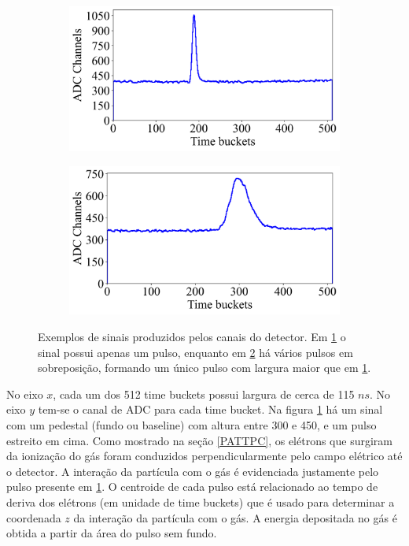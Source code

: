 \documentclass[a4paper,12pt,oneside]{book}
\begin{document}
\begin{figure}[H]
\centering
    \begin{subfigure}[b]{0.48\textwidth}
        \centering
        \includegraphics[scale=0.395]{figs/ex_sinal_1.png}
        \caption{}
        \label{subfig:exemplos_sinais_1}
    \end{subfigure}%
    \hfill
    \begin{subfigure}[b]{0.48\textwidth}
        \centering
        \includegraphics[scale=0.395]{figs/ex_sinal_2.png}
        \caption{}
        \label{subfig:exemplos_sinais_2}
    \end{subfigure}
\caption{Exemplos de sinais produzidos pelos canais do detector. Em \ref{subfig:exemplos_sinais_1} o sinal possui apenas um pulso, enquanto em \ref{subfig:exemplos_sinais_2} há vários pulsos em sobreposição, formando um único pulso com largura maior que em \ref{subfig:exemplos_sinais_1}.}
\label{fig:exemplos_sinais}
\end{figure}

\par No eixo $x$, cada um dos 512 time buckets possui largura de cerca de 115 $n s$. No eixo $y$ tem-se o canal de ADC para cada time bucket. Na figura \ref{subfig:exemplos_sinais_1} há um sinal com um pedestal (fundo ou baseline) com altura entre 300 e 450, e um pulso estreito em cima. Como mostrado na seção \ref{PATTPC}, os elétrons que surgiram da ionização do gás foram conduzidos perpendicularmente pelo campo elétrico até o detector. A interação da partícula com o gás é evidenciada justamente pelo pulso presente em \ref{subfig:exemplos_sinais_1}. O centroide de cada pulso está relacionado ao tempo de deriva dos elétrons (em unidade de time buckets) que é usado para determinar a coordenada $z$ da interação da partícula com o gás. A energia depositada no gás é obtida a partir da área do pulso sem fundo.
\end{document}
